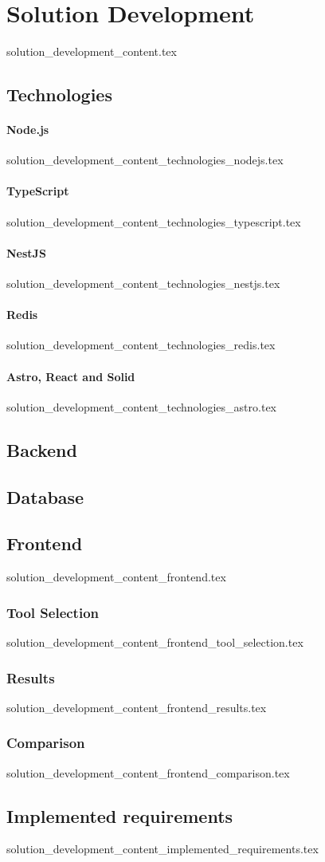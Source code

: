 \chapter{Solution Development}
  {solution_development_content.tex}

\section{Technologies}
\subsubsection*{Node.js}\label{sub:nodejs}
  {solution_development_content_technologies_nodejs.tex}
\subsubsection*{TypeScript}\label{sub:typescript}
  {solution_development_content_technologies_typescript.tex}
  \subsubsection*{NestJS}\label{sub:nestjs}
  {solution_development_content_technologies_nestjs.tex}
\subsubsection*{Redis}\label{sub:redis}
  {solution_development_content_technologies_redis.tex}
\subsubsection*{Astro, React and Solid}\label{sub:astro}
  {solution_development_content_technologies_astro.tex}

\section{Backend}

\section{Database}

\section{Frontend}
  {solution_development_content_frontend.tex}
\subsection{Tool Selection}
  {solution_development_content_frontend_tool_selection.tex}
\subsection{Results}
  {solution_development_content_frontend_results.tex}
\subsection{Comparison}
  {solution_development_content_frontend_comparison.tex}

\section{Implemented requirements}
  {solution_development_content_implemented_requirements.tex}
